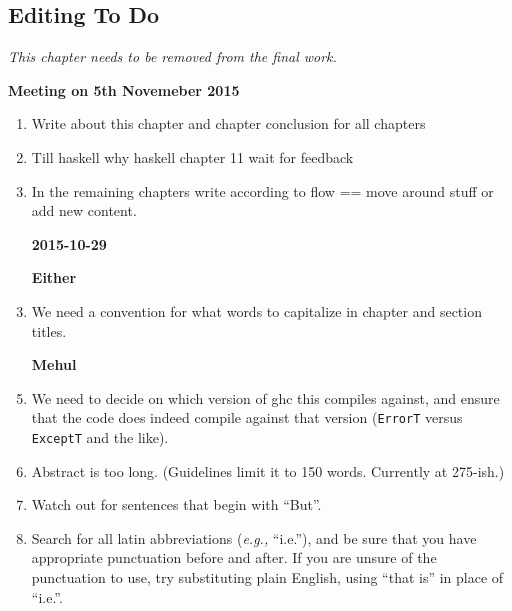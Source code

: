 
\begin{scope}
\nolinenumbers
\chapter{Editing To Do}\label{chap:to-do}

\textit{\color{red} This chapter needs to be removed from the final
  work.}

\textbf{Meeting on 5th Novemeber 2015} 
\begin{enumerate}
\item Write about this chapter and chapter conclusion for all chapters

\item Till haskell why haskell chapter 11 wait for feedback

\item In the remaining chapters write according to flow == move around stuff or add new content.
\end{enumerate}

\begin{enumerate}
\item [\textbf{2015-10-29}]
\item [\textbf{Either}]
\item
  We need a convention for what words to capitalize in chapter and
  section titles.

\item [\textbf{Mehul}]

\item
  We need to decide on which version of ghc this compiles against, and ensure that the code does indeed compile
  against that version (\Verb!ErrorT! versus \Verb!ExceptT! and the like).

\item
  Abstract is too long.  (Guidelines limit it to 150 words.  Currently
  at 275-ish.)

\item
  Watch out for sentences that begin with ``But''.

\item
  Search for all latin abbreviations (\textit{e.g.,} ``i.e.''), and be
  sure that you have appropriate punctuation before and after.
  If you are unsure of the punctuation to use, try substituting plain
  English,  using ``that is'' in place
  of ``i.e.''.


\end{enumerate}
\end{scope}
